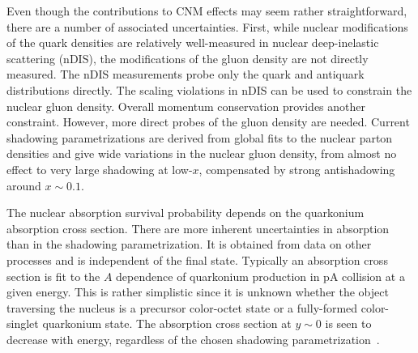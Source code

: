 Even though the contributions to CNM effects may 
seem rather straightforward, there are a number of associated uncertainties. 
First, while nuclear modifications of the quark densities are relatively 
well-measured in nuclear deep-inelastic scattering (nDIS), the modifications of the 
gluon density are not directly measured. The nDIS measurements probe only the 
quark and antiquark distributions directly. The scaling violations in nDIS can 
be used to constrain the nuclear gluon density. Overall momentum conservation 
provides another constraint. However, more direct probes of the gluon 
density are needed. Current shadowing parametrizations are derived from 
global fits to the nuclear parton densities and
give wide variations in the nuclear gluon 
density, from almost no effect to very large shadowing at low-$x$, 
compensated 
by strong antishadowing around $x \sim 0.1$.  




The nuclear absorption survival probability depends on the quarkonium 
absorption cross section. There are more inherent uncertainties 
in absorption than in the shadowing parametrization. It is obtained 
from data on other processes and is independent of the final 
state. Typically an absorption cross section is fit to the $A$ dependence 
of quarkonium production in pA collision at a given energy. 
This is rather simplistic since it is unknown whether the object traversing the nucleus is a precursor 
color-octet state or a fully-formed color-singlet quarkonium state. The \jpsi absorption cross 
section at $y \sim 0$ is seen to decrease with energy, regardless of the chosen shadowing 
parametrization~\cite{Lourenco:2008sk}. 

